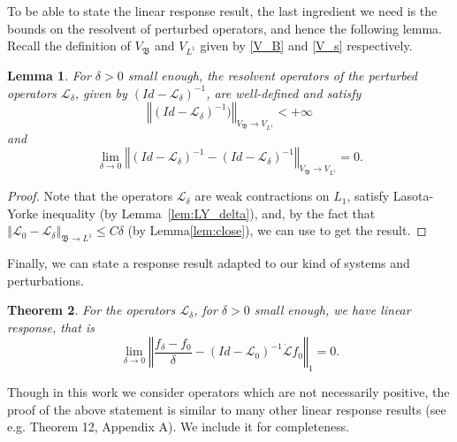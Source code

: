 \documentclass{amsart}
\newtheorem{theorem}{Theorem}
\newtheorem{lemma}[theorem]{Lemma}
\newcommand\cL{{\mathcal L}}
\newcommand\fB{{\mathfrak B}}
\newcommand{\norm}[1]{\left\Vert#1\right\Vert}
\begin{document}
To be able to state the linear response result, the last ingredient we need is the bounds on the resolvent of perturbed operators, and hence the following lemma. Recall the definition of \(V_\fB\) and \(V_{L^1}\) given by \eqref{V_B} and \eqref{V_s} respectively.

\begin{lemma}\label{lem:pert_res}
For \(\delta>0\) small enough, the resolvent operators of the perturbed operators \(\cL_\delta\), given by \((Id-\cL_\delta)^{-1}\), are well-defined and satisfy
\[\norm{(Id-\cL_\delta)^{-1})}_{V_\fB\to V_{L^1}}<+\infty\]
and 
\[
\lim\limits_{\delta \to 0}\norm{(Id-\cL_\delta)^{-1}-(Id-\cL_\delta)^{-1}}_{V_\fB\to V_{L^1}}=0.
\]
\end{lemma}
\begin{proof}
    Note that the operators \(\cL_\delta\) are weak contractions on \(L_1\), satisfy Lasota-Yorke inequality (by Lemma~\ref{lem:LY_delta}), and, by the fact that \(\norm{\cL_0-\cL_\delta}_{\fB\to L^1}\leq C\delta\) (by Lemma\ref{lem:close}), we can use \cite[Theorem 1]{KL} to get the result.
\end{proof}
 Finally, we can state a response result adapted to our kind of systems and perturbations.

\begin{theorem}\label{thm:res_diff}
     For the operators \(\cL_\delta\), for $\delta >0$ small enough, we have linear response, that is
\begin{equation*}
\lim_{\delta \rightarrow 0}\norm{\frac{f_{\delta }-f_{0}}{\delta }
-(Id-\cL_{0})^{-1}\dot{\cL}f_{0}}_{1}=0.
\end{equation*}
\end{theorem}

Though in this work we consider operators which are not necessarily positive, the proof of the above statement is similar to many other linear response results (see e.g. \cite{FG23} Theorem 12, Appendix A).
We include it for completeness.
\end{document}
